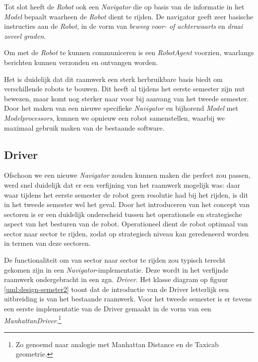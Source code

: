 \documentclass[12pt,a4paper]{report}
\begin{document}
Tot slot heeft de \emph{Robot} ook een \emph{Navigator} die op basis van de informatie in het \emph{Model} bepaalt waarheen de \emph{Robot} dient te rijden. De navigator geeft zeer basische instructies aan de \emph{Robot}, in de vorm van \emph{beweeg voor- of achterwaarts} en \emph{draai zoveel graden}.

Om met de \emph{Robot} te kunnen communiceren is een \emph{RobotAgent} voorzien, waarlangs berichten kunnen verzonden en ontvangen worden.

Het is duidelijk dat dit raamwerk een sterk herbruikbare basis biedt om verschillende robots te bouwen. Dit heeft al tijdens het eerste semester zijn nut bewezen, maar komt nog sterker naar voor bij aanvang van het tweede semester. Door het maken van een nieuwe specifieke \emph{Navigator} en bijhorend \emph{Model} met \emph{Modelprocessors}, kunnen we opnieuw een robot samenstellen, waarbij we maximaal gebruik maken van de bestaande software.

\subsection{Driver}

Ofschoon we een nieuwe \emph{Navigator} zouden kunnen maken die perfect zou passen, werd snel duidelijk dat er een verfijning van het raamwerk mogelijk was: daar waar tijdens het eerste semester de robot geen resolutie had bij het rijden, is dit in het tweede semester wel het geval. Door het introduceren van het concept van sectoren is er een duidelijk onderscheid tussen het operationele en strategische aspect van het besturen van de robot. Operationeel dient de robot optimaal van sector naar sector te rijden, zodat op strategisch niveau kan geredeneerd worden in termen van deze sectoren.

De functionaliteit om van sector naar sector te rijden zou typisch terecht gekomen zijn in een \emph{Navigator}-implementatie. Deze wordt in het verfijnde raamwerk ondergebracht in een zgn. \emph{Driver}. Het klasse diagram op figuur \ref{uml:design-semster2} toont dat de introductie van de Driver letterlijk een uitbreiding is van het bestaande raamwerk. Voor het tweede semester is er tevens een eerste implementatie van de Driver gemaakt in de vorm van een \emph{ManhattanDriver}.\footnote{Zo genoemd naar analogie met Manhattan Distance en de Taxicab geometrie.} 
\end{document}
